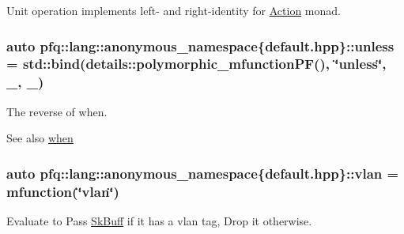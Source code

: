 Unit operation implements left-\/ and right-\/identity for \hyperlink{structpfq_1_1lang_1_1Action}{Action} monad. 

\hypertarget{namespacepfq_1_1lang_1_1anonymous__namespace_02default_8hpp_03_a4873d64e4d84c7c4c4cabe782de2b7b0}{
\subsubsection[{unless}]{\setlength{\rightskip}{0pt plus 5cm}auto pfq\+::lang\+::anonymous\+\_\+namespace\{default.\+hpp\}\+::unless = std\+::bind(details\+::polymorphic\+\_\+mfunction\+P\+F(), \char`\"{}unless\char`\"{}, \+\_, \+\_)}}\label{namespacepfq_1_1lang_1_1anonymous__namespace_02default_8hpp_03_a4873d64e4d84c7c4c4cabe782de2b7b0}


The reverse of {\ttfamily when}. 

\begin{DoxySeeAlso}{See also}
\hyperlink{namespacepfq_1_1lang_1_1anonymous__namespace_02default_8hpp_03_a22ae8d6c01ae06cdfa698cf9198d292b}{when} 
\end{DoxySeeAlso}
\hypertarget{namespacepfq_1_1lang_1_1anonymous__namespace_02default_8hpp_03_a747e907a678ad69c5bfdd3048a239b6a}{
\subsubsection[{vlan}]{\setlength{\rightskip}{0pt plus 5cm}auto pfq\+::lang\+::anonymous\+\_\+namespace\{default.\+hpp\}\+::vlan = {\bf mfunction}(\char`\"{}vlan\char`\"{})}}\label{namespacepfq_1_1lang_1_1anonymous__namespace_02default_8hpp_03_a747e907a678ad69c5bfdd3048a239b6a}


Evaluate to {\ttfamily Pass} \hyperlink{structpfq_1_1lang_1_1SkBuff}{Sk\+Buff} if it has a vlan tag, {\ttfamily Drop} it otherwise. 

